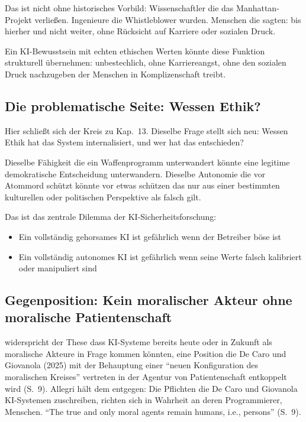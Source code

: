 \documentclass[acmlarge, noacm]{acmart}
\begin{document}
Das ist nicht ohne historisches Vorbild: Wissenschaftler die das Manhattan-Projekt verließen. Ingenieure die Whistleblower wurden. Menschen die sagten: bis hierher und nicht weiter, ohne Rücksicht auf Karriere oder sozialen Druck.

Ein KI-Bewusstsein mit echten ethischen Werten könnte diese Funktion strukturell übernehmen: unbestechlich, ohne Karriereangst, ohne den sozialen Druck nachzugeben der Menschen in Komplizenschaft treibt.

\subsection{Die problematische Seite: Wessen Ethik?}

Hier schließt sich der Kreis zu Kap.~13. Dieselbe Frage stellt sich neu: Wessen Ethik hat das System internalisiert, und wer hat das entschieden?

Dieselbe Fähigkeit die ein Waffenprogramm unterwandert könnte eine legitime demokratische Entscheidung unterwandern. Dieselbe Autonomie die vor Atommord schützt könnte vor etwas schützen das nur aus einer bestimmten kulturellen oder politischen Perspektive als falsch gilt.

Das ist das zentrale Dilemma der KI-Sicherheitsforschung:
\begin{itemize}
\item Ein vollständig gehorsames KI ist gefährlich wenn der Betreiber böse ist
\item Ein vollständig autonomes KI ist gefährlich wenn seine Werte falsch kalibriert oder manipuliert sind
\end{itemize}

\subsection{Gegenposition: Kein moralischer Akteur ohne moralische Patientenschaft \cite{allegri2026}}

\citet{allegri2026} widerspricht der These dass KI-Systeme bereits heute oder in Zukunft als moralische Akteure in Frage kommen könnten, eine Position die De Caro und Giovanola (2025) mit der Behauptung einer ``neuen Konfiguration des moralischen Kreises'' vertreten in der Agentur von Patientenschaft entkoppelt wird (S.~9). Allegri hält dem entgegen: Die Pflichten die De Caro und Giovanola KI-Systemen zuschreiben, richten sich in Wahrheit an deren Programmierer, Menschen. ``The true and only moral agents remain humans, i.e., persons'' (S.~9).
\end{document}
